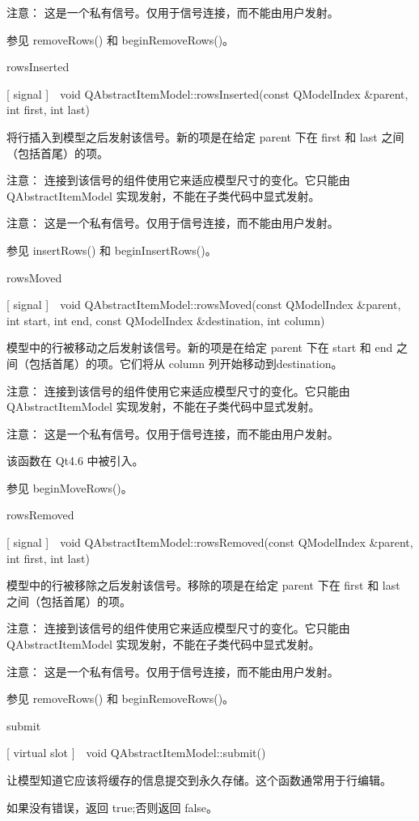 注意： 这是一个私有信号。仅用于信号连接，而不能由用户发射。

参见 removeRows() 和 beginRemoveRows()。

rowsInserted

[ signal ] void QAbstractItemModel::rowsInserted(const QModelIndex \&parent, int first, int last)

将行插入到模型之后发射该信号。新的项是在给定 parent 下在 first 和 last 之间（包括首尾）的项。

注意： 连接到该信号的组件使用它来适应模型尺寸的变化。它只能由 QAbstractItemModel 实现发射，不能在子类代码中显式发射。

注意： 这是一个私有信号。仅用于信号连接，而不能由用户发射。

参见 insertRows() 和 beginInsertRows()。

rowsMoved

[ signal ] void QAbstractItemModel::rowsMoved(const QModelIndex \&parent, int start, int end, const QModelIndex \&destination, int column)

模型中的行被移动之后发射该信号。新的项是在给定 parent 下在 start 和 end 之间（包括首尾）的项。它们将从 column 列开始移动到destination。

注意： 连接到该信号的组件使用它来适应模型尺寸的变化。它只能由 QAbstractItemModel 实现发射，不能在子类代码中显式发射。

注意： 这是一个私有信号。仅用于信号连接，而不能由用户发射。

该函数在 Qt4.6 中被引入。

参见 beginMoveRows()。

rowsRemoved

[ signal ] void QAbstractItemModel::rowsRemoved(const QModelIndex \&parent, int first, int last)

模型中的行被移除之后发射该信号。移除的项是在给定 parent 下在 first 和 last 之间（包括首尾）的项。

注意： 连接到该信号的组件使用它来适应模型尺寸的变化。它只能由 QAbstractItemModel 实现发射，不能在子类代码中显式发射。

注意： 这是一个私有信号。仅用于信号连接，而不能由用户发射。

参见 removeRows() 和 beginRemoveRows()。

submit

[ virtual slot ] void QAbstractItemModel::submit()

让模型知道它应该将缓存的信息提交到永久存储。这个函数通常用于行编辑。

如果没有错误，返回 true;否则返回 false。

